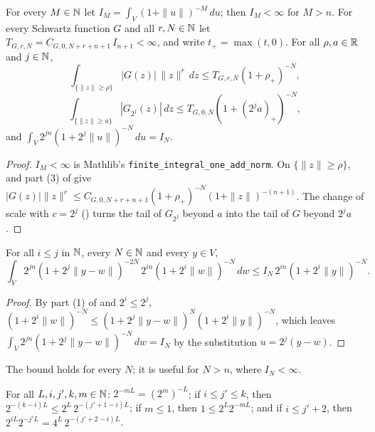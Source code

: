 \begin{lemma}
\label{lem:schwartz-tails}
\leanok
{}
For every $M \in \mathbb{N}$ let $I_M = \int_V (1 + \|u\|)^{-M} \, du$; then $I_M < \infty$ for $M > n$.
For every Schwartz function $G$ and all $r, N \in \mathbb{N}$ let
$T_{G,r,N} = C_{G,0,N+r+n+1} \, I_{n+1} < \infty$, and write $t_+ = \max(t, 0)$. For all
$\rho, a \in \mathbb{R}$ and $j \in \mathbb{N}$,
\[
  \int_{\{\|z\| \geq \rho\}} |G(z)| \, \|z\|^r \, dz \leq T_{G,r,N} (1 + \rho_+)^{-N},
\]
\[
  \int_{\{\|z\| \geq a\}} |G_{2^j}(z)| \, dz \leq T_{G,0,N} (1 + (2^j a)_+)^{-N},
\]
and $\int_V 2^{jn} (1 + 2^j \|u\|)^{-N} \, du = I_N$.
\end{lemma}

\begin{proof}
\leanok
$I_M < \infty$ is Mathlib's \texttt{finite\_integral\_one\_add\_norm}. On $\{\|z\| \geq \rho\}$,
 and part (3) of  give
$|G(z)| \|z\|^r \leq C_{G,0,N+r+n+1} (1 + \rho_+)^{-N} (1 + \|z\|)^{-(n+1)}$. The change of scale
with $c = 2^j$ () turns the tail of $G_{2^j}$ beyond $a$ into the tail
of $G$ beyond $2^j a$.
\end{proof}

\begin{lemma}
\label{lem:two-decay-bumps}
\leanok
{}
For all $i \leq j$ in $\mathbb{N}$, every $N \in \mathbb{N}$ and every $y \in V$,
\[
  \int_V 2^{jn} (1 + 2^j \|y - w\|)^{-2N} \, 2^{in} (1 + 2^i \|w\|)^{-N} \, dw
  \leq I_N \, 2^{in} (1 + 2^i \|y\|)^{-N} .
\]
\end{lemma}

\begin{proof}
\leanok
By part (1) of  and $2^i \leq 2^j$,
$(1 + 2^i \|w\|)^{-N} \leq (1 + 2^j \|y - w\|)^N (1 + 2^i \|y\|)^{-N}$, which leaves
$\int_V 2^{jn} (1 + 2^j \|y - w\|)^{-N} \, dw = I_N$ by the substitution $u = 2^j (y - w)$.
\end{proof}

The bound holds for every $N$; it is useful for $N > n$, where $I_N < \infty$.

\begin{lemma}
\label{lem:dyadic-weights-integer}
\leanok
{}
For all $L, i, j', k, m \in \mathbb{N}$: $2^{-mL} = (2^m)^{-L}$; if $i \leq j' \leq k$, then
$2^{-(k-i)L} \leq 2^L \, 2^{-(j'+1-i)L}$; if $m \leq 1$, then $1 \leq 2^L 2^{-mL}$; and if
$i \leq j' + 2$, then $2^{iL} 2^{-j'L} = 4^L \, 2^{-(j'+2-i)L}$.
\end{lemma}


